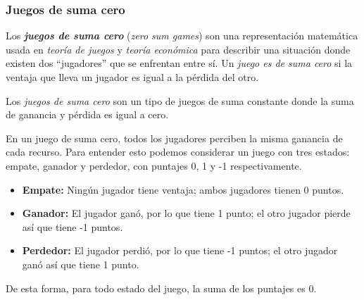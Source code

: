 \subsubsection{Juegos de suma cero}
  Los \textit{\textbf{juegos de suma cero}} \cite{ZerosumGame2022} (\textit{zero sum games}) 
  son una representación matemática usada en \textit{teoría de juegos} y \textit{teoría 
  económica} para describir una situación donde existen dos \enquote{jugadores} que se enfrentan
  entre sí.
  Un \textit{juego es de suma cero} si la ventaja que lleva un jugador es igual a la pérdida del
  otro.

  Los \textit{juegos de suma cero} son un tipo de juegos de suma constante donde la suma de 
  ganancia y pérdida es igual a cero.

  En un juego de suma cero, todos los jugadores perciben la misma ganancia de cada recurso.   
  Para entender esto podemos considerar un juego con tres estados: empate, ganador y perdedor, 
  con puntajes 0, 1 y -1 respectivamente.

  \begin{itemize}
    \item \textbf{Empate:} Ningún jugador tiene ventaja; ambos jugadores tienen 0 puntos.
    \item \textbf{Ganador:} El jugador ganó, por lo que tiene 1 punto; el otro jugador pierde 
      así que tiene -1 puntos.
    \item \textbf{Perdedor:} El jugador perdió, por lo que tiene -1 puntos; el otro jugador ganó 
      así que tiene 1 punto.
  \end{itemize}
  
  De esta forma, para todo estado del juego, la suma de los puntajes es 0.